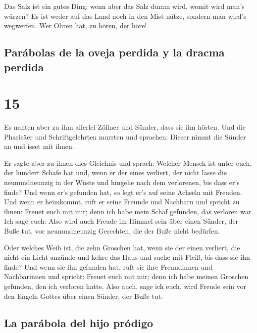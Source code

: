  Das Salz ist ein gutes Ding; wenn aber das Salz dumm
wird, womit wird man's würzen?  Es ist weder auf das Land
noch in den Mist nütze, sondern man wird's wegwerfen. Wer Ohren hat, zu
hören, der höre!

\hypertarget{paruxe1bolas-de-la-oveja-perdida-y-la-dracma-perdida}{%
\subsection{Parábolas de la oveja perdida y la dracma
perdida}\label{paruxe1bolas-de-la-oveja-perdida-y-la-dracma-perdida}}

\hypertarget{section-14}{%
\section{15}\label{section-14}}

 Es nahten aber zu ihm allerlei Zöllner und Sünder, dass
sie ihn hörten.  Und die Pharisäer und Schriftgelehrten
murrten und sprachen: Dieser nimmt die Sünder an und isset mit ihnen.

 Er sagte aber zu ihnen dies Gleichnis und sprach:
 Welcher Mensch ist unter euch, der hundert Schafe hat
und, wenn er der eines verliert, der nicht lasse die neunundneunzig in
der Wüste und hingehe nach dem verlorenen, bis dass er's finde?
 Und wenn er's gefunden hat, so legt er's auf seine
Achseln mit Freuden.  Und wenn er heimkommt, ruft er seine
Freunde und Nachbarn und spricht zu ihnen: Freuet euch mit mir; denn ich
habe mein Schaf gefunden, das verloren war.  Ich sage
euch: Also wird auch Freude im Himmel sein über einen Sünder, der Buße
tut, vor neunundneunzig Gerechten, die der Buße nicht bedürfen.

 Oder welches Weib ist, die zehn Groschen hat, wenn sie
der einen verliert, die nicht ein Licht anzünde und kehre das Haus und
suche mit Fleiß, bis dass sie ihn finde?  Und wenn sie ihn
gefunden hat, ruft sie ihre Freundinnen und Nachbarinnen und spricht:
Freuet euch mit mir; denn ich habe meinen Groschen gefunden, den ich
verloren hatte.  Also auch, sage ich euch, wird Freude
sein vor den Engeln Gottes über einen Sünder, der Buße tut.

\hypertarget{la-paruxe1bola-del-hijo-pruxf3digo}{%
\subsection{La parábola del hijo
pródigo}\label{la-paruxe1bola-del-hijo-pruxf3digo}}

